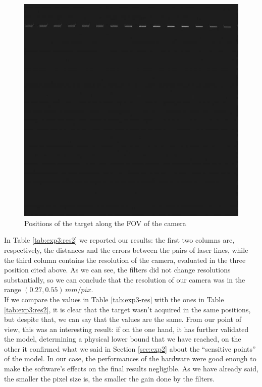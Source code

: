 \begin{figure}[!b]
\begin{minipage}[c]{.32\textwidth}
    \end{minipage}
    \hfill
    \begin{minipage}[c]{.32\textwidth}
      \centering
      \includegraphics[width=\textwidth]{./images/analysis/exp3/510.jpg}
    \end{minipage}
    
    \caption{Positions of the target along the \acs{FOV} of the camera}
    \label{fig:line-pos}
  \end{figure}
In Table \ref{tab:exp3:res2} we reported our results: the first two columns are, respectively, the distances and the errors between the pairs of laser lines, while the third column contains the resolution of the camera, evaluated in the three position cited above. As we can see, the filters did not change resolutions substantially, so we can conclude that the resolution of our camera was in the range $\left( 0.27, 0.55 \right) \, mm/pix$. \\
  

If we compare the values in Table \ref{tab:exp3-res} with the ones in Table \ref{tab:exp3:res2}, it is clear that the target wasn't acquired in the same positions, but despite that, we can say that the values are the same. From our point of view, this was an interesting result: if on the one hand, it has further validated the model, determining a physical lower bound that we have reached, on the other it confirmed what we said in Section \ref{sec:exp2} about the ``sensitive points'' of the model. In our case, the performances of the hardware were good enough to make the software's effects on the final results negligible. As we have already said, the smaller the pixel size is, the smaller the gain done by the filters.
